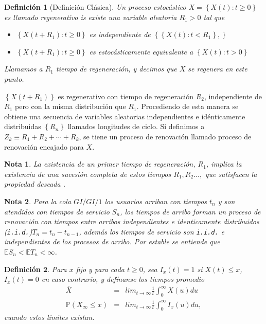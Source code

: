 \documentclass{article}
\newtheorem{Def}{Definición}
\newtheorem{Note}{Nota}
\newcommand{\esp}{\mathbb{E}}
\newcommand{\prob}{\mathbb{P}}
\begin{document}
\begin{Def}[Definici\'on Cl\'asica]
Un proceso estoc\'astico $X=\left\{X\left(t\right):t\geq0\right\}$ es llamado regenerativo is existe una variable aleatoria $R_{1}>0$ tal que
\begin{itemize}
\item[i)] $\left\{X\left(t+R_{1}\right):t\geq0\right\}$ es independiente de $\left\{\left\{X\left(t\right):t<R_{1}\right\},\right\}$
\item[ii)] $\left\{X\left(t+R_{1}\right):t\geq0\right\}$ es estoc\'asticamente equivalente a $\left\{X\left(t\right):t>0\right\}$
\end{itemize}

Llamamos a $R_{1}$ tiempo de regeneraci\'on, y decimos que $X$ se regenera en este punto.
\end{Def}

$\left\{X\left(t+R_{1}\right)\right\}$ es regenerativo con tiempo de regeneraci\'on $R_{2}$, independiente de $R_{1}$ pero con la misma distribuci\'on que $R_{1}$. Procediendo de esta manera se obtiene una secuencia de variables aleatorias independientes e id\'enticamente distribuidas $\left\{R_{n}\right\}$ llamados longitudes de ciclo. Si definimos a $Z_{k}\equiv R_{1}+R_{2}+\cdots+R_{k}$, se tiene un proceso de renovaci\'on llamado proceso de renovaci\'on encajado para $X$.


\begin{Note}
La existencia de un primer tiempo de regeneraci\'on, $R_{1}$, implica la existencia de una sucesi\'on completa de estos tiempos $R_{1},R_{2}\ldots,$ que satisfacen la propiedad deseada \cite{Sigman2}.
\end{Note}


\begin{Note} Para la cola $GI/GI/1$ los usuarios arriban con tiempos $t_{n}$ y son atendidos con tiempos de servicio $S_{n}$, los tiempos de arribo forman un proceso de renovaci\'on  con tiempos entre arribos independientes e identicamente distribuidos (\texttt{i.i.d.})$T_{n}=t_{n}-t_{n-1}$, adem\'as los tiempos de servicio son \texttt{i.i.d.} e independientes de los procesos de arribo. Por \textit{estable} se entiende que $\esp S_{n}<\esp T_{n}<\infty$.
\end{Note}
 


\begin{Def}
Para $x$ fijo y para cada $t\geq0$, sea $I_{x}\left(t\right)=1$ si $X\left(t\right)\leq x$,  $I_{x}\left(t\right)=0$ en caso contrario, y def\'inanse los tiempos promedio
\begin{eqnarray*}
\overline{X}&=&lim_{t\rightarrow\infty}\frac{1}{t}\int_{0}^{\infty}X\left(u\right)du\\
\prob\left(X_{\infty}\leq x\right)&=&lim_{t\rightarrow\infty}\frac{1}{t}\int_{0}^{\infty}I_{x}\left(u\right)du,
\end{eqnarray*}
cuando estos l\'imites existan.
\end{Def}
\end{document}
